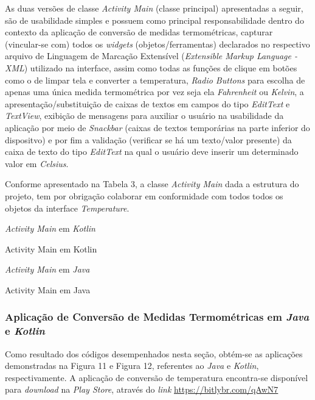 As duas versões de classe \textit{Activity Main} (classe principal) apresentadas a seguir, são de usabilidade simples e possuem como principal responsabilidade dentro do contexto da aplicação de conversão de medidas termométricas, capturar (vincular-se com) todos os \textit{widgets} (objetos/ferramentas) declarados no respectivo arquivo de Linguagem de Marcação Extensível (\textit{Extensible Markup Language - XML}) utilizado na interface, assim como todas as funções de clique em botões como o de limpar tela e converter a temperatura, \textit{Radio Buttons} para escolha de apenas uma única medida termométrica por vez seja ela \textit{Fahrenheit} ou \textit{Kelvin}, a apresentação/substituição de caixas de textos em campos do tipo \textit{EditText} e \textit{TextView}, exibição de mensagens para auxiliar o usuário na usabilidade da aplicação por meio de \textit{Snackbar} (caixas de textos temporárias na parte inferior do dispositvo) e por fim a validação (verificar se há um texto/valor presente) da caixa de texto do tipo \textit{EditText} na qual o usuário deve inserir um determinado valor em \textit{Celsius}.

Conforme apresentado na Tabela 3, a classe \textit{Activity Main} dada a estrutura do projeto, tem por obrigação colaborar em conformidade com todos todos os objetos da interface \textit{Temperature}.

\textit{Activity Main} em \textit{Kotlin}
\caption{Activity Main em Kotlin}
 

\textit{Activity Main} em \textit{Java}
\caption{Activity Main em Java}
 

\subsubsection{Aplicação de Conversão de Medidas Termométricas em \textit{Java} e \textit{Kotlin}}

Como resultado dos códigos desempenhados nesta seção, obtém-se as aplicações demonstradas na Figura 11 e Figura 12, referentes ao \textit{Java} e \textit{Kotlin}, respectivamente.
A aplicação de conversão de temperatura encontra-se disponível para \textit{download} na \textit{Play Store}, através do \textit{link} \url{https://bitlybr.com/qAwN7}

